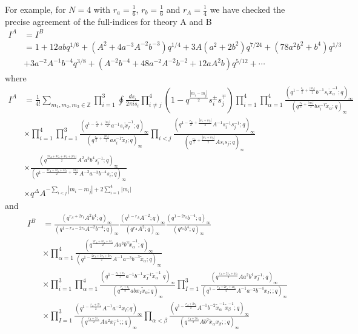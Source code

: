 \documentclass[12pt]{article}
\numberwithin{equation}{section}
\begin{document}
For example, for $N=4$ with $r_a=\frac16$, $r_b=\frac16$ and $r_A=\frac14$ we have checked the precise agreement of the full-indices for theory A and B
\begin{align}
I^A&=I^B
\nonumber\\
&=1+12abq^{1/6}+(A^2+4a^{-3}A^{-2}b^{-3})q^{1/4}
+3A(a^2+2b^2)q^{7/24}+(78a^2b^2+b^4)q^{1/3}
\nonumber\\
&+3a^{-2}A^{-1}b^{-4}q^{3/8}
+(A^{-2}b^{-4}+48a^{-2}A^{-2}b^{-2}+12aA^2b)q^{5/12}+\cdots
\end{align}
where 
\begin{align}
I^A&=
\frac{1}{4!}\sum_{m_1,m_2,m_3\in \mathbb{Z}}
\prod_{i=1}^3 
\oint 
\frac{ds_i}{2\pi is_i}
\prod_{i \ne j}^4 (1-q^{\frac{|m_i-m_j|}{2}}s_i^{\pm}s_j^{\mp})
\prod_{i=1}^4
\prod_{\alpha=1}^{4}
\frac{
(q^{1-\frac{r_b}{2}+\frac{|m_i|}{2}}b^{-1}s_i\tilde{x}_{\alpha}^{-1};q)_{\infty}
}{
(q^{\frac{r_b}{2}+\frac{|m_i|}{2}}bs_i^{-1}\tilde{x}_{\alpha};q)_{\infty}
}
\nonumber\\
&\times 
\prod_{i=1}^4 \prod_{I=1}^3 
\frac{
(q^{1-\frac{r_a}{2}+\frac{|m_i|}{2}}a^{-1}s_i\tilde{x}_{I}^{-1};q)_{\infty}
}
{
(q^{\frac{r_a}{2}+\frac{|m_i|}{2}}as_i^{-1}\tilde{x}_{I};q)_{\infty}
}
\prod_{i<j}
\frac{
(q^{1-\frac{r_A}{2}+\frac{|m_i+m_j|}{2}}A^{-1}s_i^{-1}s_j^{-1};q)_{\infty}
}
{
(q^{\frac{r_A}{2}+\frac{|m_i+m_j|}{2}}As_is_j;q)_{\infty}
}
\nonumber\\
&\times 
\frac{
(q^{\frac{2r_A+3r_a+4r_b+|m_i|}{2}}A^{2}a^3 b^4 s_i^{-1};q)_{\infty}
}
{
(q^{1-\frac{2r_A+3r_a+4r_b}{2}+\frac{|m_i|}{2}}A^{-2}a^{-3}b^{-4}s_i;q)_{\infty}
}
\nonumber\\
&\times 
q^{
\Delta
}
A^{-\sum_{i<j}|m_i-m_j|+2\sum_{i=1}^4|m_i|}
\end{align}
and 
\begin{align}
I^B&=
\frac{
(q^{r_A+2r_b}A^2b^4;q)_{\infty}
}
{
(q^{1-r_A-2r_b}A^{-2}b^{-4};q)_{\infty}
}
\frac{
(q^{1-r_A}A^{-2};q)_{\infty}
}
{
(q^{r_A}A^{2};q)_{\infty}
}
\frac{
(q^{1-2r_b}b^{-4};q)_{\infty}
}
{
(q^{r_b}b^{4};q)_{\infty}
}
\nonumber\\
&\times 
\prod_{\alpha=1}^4
\frac{
(q^{\frac{2r_A+3r_a+3r_b}{2}}Aa^3b^3\tilde{x}_{\alpha}^{-1};q)_{\infty}
}
{
(q^{1-\frac{2r_A+3r_a+3r_b}{2}}A^{-1}a^{-3}b^{-3}\tilde{x}_{\alpha};q)_{\infty}
}
\nonumber\\
&\times 
\prod_{i=1}^{3}
\prod_{\alpha=1}^{4}
\frac{
(q^{1-\frac{r_a+r_b}{2}}a^{-1}b^{-1}x_I^{-1}\tilde{x}_{\alpha}^{-1}\;q)_{\infty}
}
{
(q^{\frac{r_a+r_b}{2}}abx_I\tilde{x}_{\alpha};q)_{\infty}
}
\prod_{I=1}^3 
\frac{
(q^{\frac{r_A+2r_a+4r_b}{2}}Aa^2b^{4}x_I^{-1};q)_{\infty}
}
{
(q^{1-\frac{r_A+2r_a+4r_b}{2}}A^{-1}a^{-2}b^{-4}x_I;;q)_{\infty}
}
\nonumber\\
&\times 
\prod_{I=1}^3
\frac{
(q^{1-\frac{r_A+2r_a}{2}}A^{-1}a^{-2}x_I;q)_{\infty}
}
{
(q^{\frac{r_A+2r_a}{2}}Aa^{2}x_I^{-1};;q)_{\infty}
}
\prod_{\alpha<\beta}
\frac{
(q^{1-\frac{r_A+2r_b}{2}}A^{-1}b^{-2}\tilde{x}_{\alpha}^{-1}\tilde{x}_{\beta}^{-1};q)_{\infty}
}
{
(q^{\frac{r_A+2r_b}{2}}Ab^{2}\tilde{x}_{\alpha}x_{\beta};;q)_{\infty}
}
\end{align}
\end{document}
